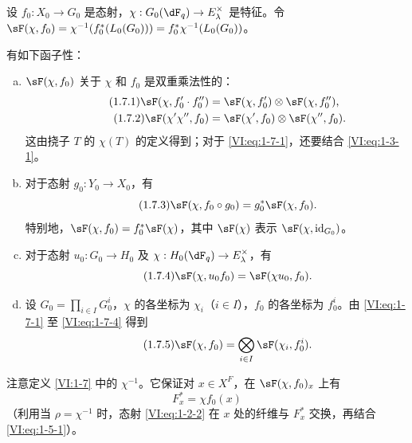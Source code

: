 \begin{definition_}\label{VI:1-7}
设 $f_0:X_0\to G_0$ 是态射，$\chi:G_0(\dF_q)\to E_\lambda^\times$ 是特征。令 $\sF(\chi,f_0) = \chi^{-1}(f_0^\ast (L_0(G_0))) = f_0^\ast\chi^{-1}(L_0(G_0))$。
\end{definition_}

有如下函子性：
\begin{enumerate}[a)]
  \item $\sF(\chi,f_0)$ 关于 $\chi$ 和 $f_0$ 是双重乘法性的：
    \begin{align*}\tag{1.7.1}\label{VI:eq:1-7-1}
      \sF(\chi,f_0'\cdot f_0'') &= \sF(\chi,f_0')\otimes \sF(\chi,f_0'') \text{,} \\
      \tag{1.7.2}\label{VI:eq:1-7-2}
      \sF(\chi'\chi'',f_0) &= \sF(\chi',f_0)\otimes \sF(\chi'',f_0) \text{.}
    \end{align*}
    这由挠子 $T$ 的 $\chi(T)$ 的定义得到；对于 \eqref{VI:eq:1-7-1}，还要结合 \eqref{VI:eq:1-3-1}。
  \item 对于态射 $g_0:Y_0\to X_0$，有
    \begin{equation*}\tag{1.7.3}\label{VI:eq:1-7-3}
      \sF(\chi,f_0\circ g_0) = g_0^\ast \sF(\chi,f_0) \text{.}
    \end{equation*}
    特别地，$\sF(\chi,f_0) = f_0^\ast \sF(\chi)$，其中 $\sF(\chi)$ 表示 $\sF(\chi,\operatorname{id}_{G_0})$。
  \item 对于态射 $u_0:G_0\to H_0$ 及 $\chi:H_0(\dF_q) \to E_\lambda^\times$，有
    \begin{equation*}\tag{1.7.4}\label{VI:eq:1-7-4}
      \sF(\chi,u_0 f_0) = \sF(\chi u_0,f_0) \text{.}
    \end{equation*}
  \item 设 $G_0=\prod_{i\in I} G_0^i$，$\chi$ 的各坐标为 $\chi_i$（$i\in I$），$f_0$ 的各坐标为 $f_0^i$。由 \eqref{VI:eq:1-7-1} 至 \eqref{VI:eq:1-7-4} 得到
    \begin{equation*}\tag{1.7.5}\label{VI:eq:1-7-5}
      \sF(\chi,f_0) = \bigotimes_{i\in I} \sF(\chi_i,f_0^i) \text{.}
    \end{equation*}
\end{enumerate}

注意定义 \ref{VI:1-7} 中的 $\chi^{-1}$。它保证对 $x\in X^F$，在 $\sF(\chi,f_0)_x$ 上有
\begin{equation*}\tag{1.7.6}\label{VI:eq:1-7-6}
  F_x^\ast = \chi f_0(x)
\end{equation*}
（利用当 $\rho=\chi^{-1}$ 时，态射 \eqref{VI:eq:1-2-2} 在 $x$ 处的纤维与 $F_x^\ast$ 交换，再结合 \eqref{VI:eq:1-5-1}）。

